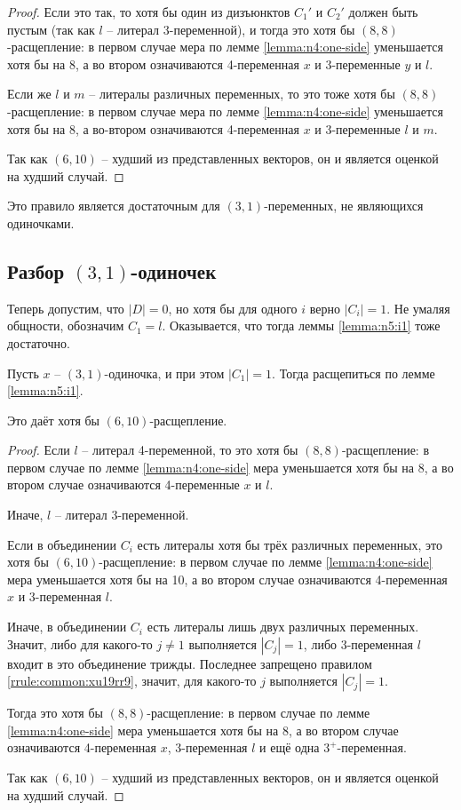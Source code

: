\begin{proof}
 Если это так, то хотя бы один из дизъюнктов $C_1'$ и $C_2'$ должен быть пустым (так как $l$ -- литерал 3-переменной), и тогда это хотя бы $(8,8)$-расщепление: в первом случае мера по лемме \ref{lemma:n4:one-side} уменьшается хотя бы на 8, а во втором означиваются 4-переменная $x$ и 3-переменные $y$ и $l$.

 Если же $l$ и $m$ -- литералы различных переменных, то это тоже хотя бы $(8,8)$-расщепление: в первом случае мера по лемме \ref{lemma:n4:one-side} уменьшается хотя бы на 8, а во-втором означиваются 4-переменная $x$ и 3-переменные $l$ и $m$.

 Так как $(6,10)$ -- худший из представленных векторов, он и является оценкой на худший случай.
\end{proof}

Это правило является достаточным для $(3,1)$-переменных, не являющихся одиночками.

\subsection{Разбор $(3,1)$-одиночек}
\label{subsec:n4:31-2c}

Теперь допустим, что $|D| = 0$, но хотя бы для одного $i$ верно $|C_i| = 1$.
Не умаляя общности, обозначим $C_1 = l$.
Оказывается, что тогда леммы \ref{lemma:n5:i1} тоже достаточно.

\begin{brule}
 Пусть $x$ -- $(3,1)$-одиночка, и при этом $|C_1| = 1$.
 Тогда расщепиться по лемме \ref{lemma:n5:i1}.

 Это даёт хотя бы $(6,10)$-расщепление.
 \label{brule:n4:31:2c}
\end{brule}

\begin{proof}
 Если $l$ -- литерал 4-переменной, то это хотя бы $(8,8)$-расщепление: в первом случае по лемме \ref{lemma:n4:one-side} мера уменьшается хотя бы на 8, а во втором случае означиваются 4-переменные $x$ и $l$.

 Иначе, $l$ -- литерал 3-переменной.

 Если в объединении $C_i$ есть литералы хотя бы трёх различных переменных, это хотя бы $(6,10)$-расщепление: в первом случае по лемме \ref{lemma:n4:one-side} мера уменьшается хотя бы на 10, а во втором случае означиваются 4-переменная $x$ и 3-переменная $l$.

 Иначе, в объединении $C_i$ есть литералы лишь двух различных переменных.
 Значит, либо для какого-то $j \neq 1$ выполняется $|C_j| = 1$, либо 3-переменная $l$ входит в это объединение трижды. Последнее запрещено правилом \ref{rrule:common:xu19rr9}, значит, для какого-то $j$ выполняется $|C_j| = 1$.

 Тогда это хотя бы $(8,8)$-расщепление: в первом случае по лемме \ref{lemma:n4:one-side} мера уменьшается хотя бы на 8, а во втором случае означиваются 4-переменная $x$, 3-переменная $l$ и ещё одна $3^+$-переменная.

 Так как $(6,10)$ -- худший из представленных векторов, он и является оценкой на худший случай.
\end{proof}

